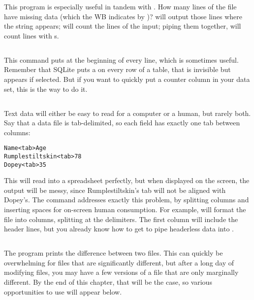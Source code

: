 This program is especially useful in tandem with . How many lines
of the  file have missing data (which the WB indicates by
)?  will output those lines
where the string  appears;  will count the lines of the
input; piping them together,  will count lines with s.

\subsection{} This command puts  at the
beginning of every line, which is sometimes useful. Remember that SQLite
puts a  on every row of a table, that is invisible but
appears if \si{select}ed. But if you want to quickly put a counter
column in your data set, this is the way to do it.


\subsection{} Text data 
will either be easy to read for a computer or a human, but rarely both.
Say that a data file is tab-delimited, so each field has exactly one tab
between columns:
\begin{lstlisting}
Name<tab>Age
Rumplestiltskin<tab>78
Dopey<tab>35
\end{lstlisting}

This will read into a spreadsheet perfectly, but when displayed on the
screen, the output will be messy, since Rumplestiltskin's tab will not
be aligned with Dopey's. The  command addresses exactly this problem,
by splitting columns and inserting spaces for on-screen human
consumption. For example,  will format
the  file into columns, splitting at the \bi{|}
delimiters. The first column will include the header lines, but you
already know how to get  to pipe headerless data into
.

\subsection{} The  program prints the difference
between two files. This can quickly be overwhelming for files that are
significantly different, but after a long day of modifying files, you
may have a few versions of a file that are only marginally different. 
By the end of this chapter, that will be the case, so various
opportunities to use  will appear below.

